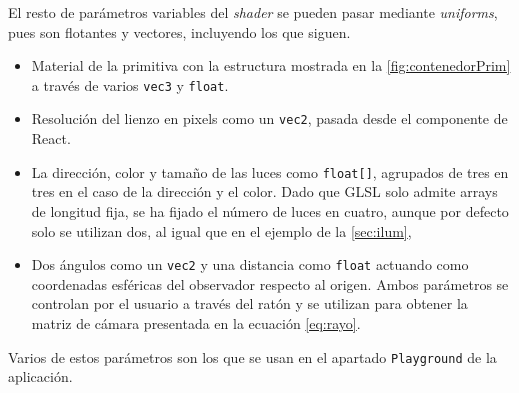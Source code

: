 El resto de parámetros variables del \textit{shader} se pueden pasar mediante \textit{uniforms}, pues son flotantes y vectores, incluyendo los que siguen.
\begin{itemize}
    \item Material de la primitiva con la estructura mostrada en la \autoref{fig:contenedorPrim} a través de varios \texttt{vec3} y \texttt{float}. 
    \item Resolución del lienzo en pixels como un \texttt{vec2}, pasada desde el componente de React.
    \item La dirección, color y tamaño de las luces como \texttt{float[]}, agrupados de tres en tres en el caso de la dirección y el color. Dado que GLSL solo admite arrays de longitud fija, se ha fijado el número de luces en cuatro, aunque por defecto solo se utilizan dos, al igual que en el ejemplo de la \autoref{sec:ilum},
    \item Dos ángulos como un \texttt{vec2} y una distancia como \texttt{float} actuando como coordenadas esféricas del observador respecto al origen. Ambos parámetros se controlan por el usuario a través del ratón y se utilizan para obtener la matriz de cámara presentada en la ecuación \eqref{eq:rayo}.
\end{itemize}
Varios de estos parámetros son los que se usan en el apartado \texttt{Playground} de la aplicación.\newline

